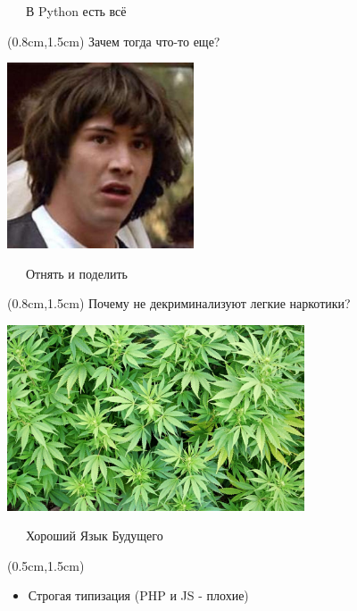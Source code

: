 \documentclass[xetex,18pt,aspectratio=43]{beamer}
\begin{document}
\begin{Large}
\begin{frame}{\ \ \ В Python есть всё}
\begin{textblock*}{\framewidth}(0.8cm,1.5cm)
Зачем тогда что-то еще?\\
\begin{minipage}{\textwidth}
  \centering
  \includegraphics[height=5.5cm]{img/Conspiracy-Keanu}
\end{minipage}
\end{textblock*}
\end{frame}

\begin{frame}{\ \ \ Отнять и поделить}
\begin{textblock*}{\framewidth}(0.8cm,1.5cm)
Почему не декриминализуют легкие наркотики?\\
\begin{minipage}{\textwidth}
  \centering
  \includegraphics[height=5.5cm]{img/weed}
\end{minipage}
\end{textblock*}
\end{frame}

\begin{frame}{\ \ \ Хороший Язык Будущего}
\begin{textblock*}{\framewidth-0.8cm}(0.5cm,1.5cm)
\begin{itemize}
  \item Строгая типизация (PHP и JS - плохие)
\end{itemize}
\end{textblock*}
\end{frame}


\end{Large}
\end{document}
